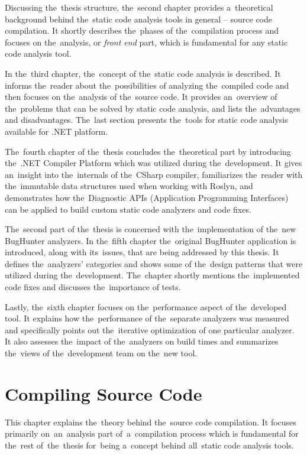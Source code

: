 \documentclass[
  digital, %
  table,   %
  lof,     %
  lot,     %
  oneside,
]{fithesis3}
\begin{document}
Discussing the~thesis structure, the~second chapter provides a~theoretical background behind the~static code analysis tools in general -- source code compilation. It shortly describes the~phases of the~compilation process and focuses on the~analysis, or \textit{front end} part, which is fundamental for any static code analysis tool.

In the~third chapter, the~concept of the~static code analysis is described. It informs the~reader about the~possibilities of analyzing the~compiled code and then focuses on the~analysis of the~source code. It provides an~overview of the~problems that can be solved by static code analysis, and lists the~advantages and disadvantages. The~last section presents the~tools for static code analysis available for .NET platform.

The~fourth chapter of the~thesis concludes the~theoretical part by introducing the~.NET Compiler Platform which was utilized during the~development. It gives an~insight into the~internals of the~CSharp compiler, familiarizes the~reader with the~immutable data structures used when working with Roslyn, and demonstrates how the~Diagnostic APIs (Application Programming Interfaces) can be applied to build custom static code analyzers and code fixes.

The~second part of the~thesis is concerned with the~implementation of the~new BugHunter analyzers. In the~fifth chapter the~original BugHunter application is introduced, along with its~issues, that are being addressed by this thesis. It defines the~analyzers' categories and shows some of the~design patterns that were utilized during the~development. The~chapter shortly mentions the~implemented code fixes and discusses the~importance of tests.

Lastly, the~sixth chapter focuses on the~performance aspect of the~developed tool. It explains how the~performance of the~separate analyzers was measured and specifically points out the~iterative optimization of one particular analyzer. It also assesses the~impact of the~analyzers on build times and summarizes the~views of the~development team on the~new tool.

\chapter{Compiling Source Code}
\label{chap:compilers}
This chapter explains the~theory behind the~source code compilation. It focuses primarily on~an~analysis part of~a~compilation process which is fundamental for the~rest of~the~thesis for~being a~concept behind all~static code analysis tools.
\end{document}

